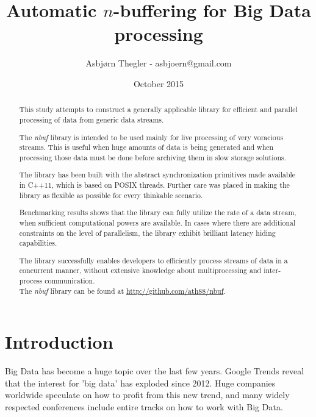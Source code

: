 \documentclass[a4paper]{article}
\title{Automatic $n$-buffering for Big Data processing}
\author{Asbj\o rn Thegler - asbjoern@gmail.com}
\date{October 2015}
\newcommand{\nbuf}{\textit{nbuf} }
\begin{document}
\maketitle

\sloppy

\begin{abstract}
\begin{doublespace}
This study attempts to construct a generally applicable library for efficient and parallel processing of data from generic data streams.

The \nbuf library is intended to be used mainly for live processing of very voracious streams. This is useful when huge amounts of data is being generated and when processing those data must be done before archiving them in slow storage solutions.

The library has been built with the abstract synchronization primitives made available in C++11, which is based on POSIX threads. Further care was placed in making the library as flexible as possible for every thinkable scenario.

Benchmarking results shows that the library can fully utilize the rate of a data stream, when sufficient computational powers are available. In cases where there are additional constraints on the level of parallelism, the library exhibit brilliant latency hiding capabilities.

The library successfully enables developers to efficiently process streams of data in a concurrent manner, without extensive knowledge about multiprocessing and inter-process communication.\\

The \nbuf library can be found at \url{http://github.com/ath88/nbuf}.

\end{doublespace}
\end{abstract}

\newpage
\tableofcontents

\newpage
\section{Introduction}
Big Data has become a huge topic over the last few years. Google Trends reveal that the interest for 'big data' has exploded since 2012. Huge companies worldwide speculate on how to profit from this new trend, and many widely respected conferences include entire tracks on how to work with Big Data.\\
\end{document}
